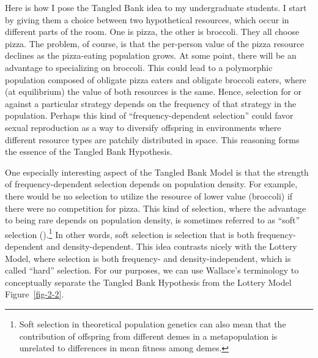 \documentclass[
  letterpaper,
]{book}
\begin{document}
Here is how I pose the Tangled Bank idea to my undergraduate students. I
start by giving them a choice between two hypothetical resources, which
occur in different parts of the room. One is pizza, the other is
broccoli. They all choose pizza. The problem, of course, is that the
per-person value of the pizza resource declines as the pizza-eating
population grows. At some point, there will be an advantage to
specializing on broccoli. This could lead to a polymorphic population
composed of obligate pizza eaters and obligate broccoli eaters, where
(at equilibrium) the value of both resources is the same. Hence,
selection for or against a particular strategy depends on the frequency
of that strategy in the population. Perhaps this kind of
``frequency-dependent selection'' could favor sexual reproduction as a
way to diversify offspring in environments where different resource
types are patchily distributed in space. This reasoning forms the
essence of the Tangled Bank Hypothesis.

One especially interesting aspect of the Tangled Bank Model is that the
strength of frequency-dependent selection depends on population density.
For example, there would be no selection to utilize the resource of
lower value (broccoli) if there were no competition for pizza. This kind
of selection, where the advantage to being rare depends on population
density, is sometimes referred to as ``soft'' selection
().\footnote{Soft selection in
  theoretical population genetics can also mean that the contribution of
  offspring from different demes in a metapopulation is unrelated to
  differences in mean fitness among demes.} In other words, soft
selection is selection that is both frequency-dependent and
density-dependent. This idea contrasts nicely with the Lottery Model,
where selection is both frequency- and density-independent, which is
called ``hard'' selection. For our purposes, we can use Wallace's
terminology to conceptually separate the Tangled Bank Hypothesis from
the Lottery Model Figure~\ref{fig-2-2}.
\end{document}
